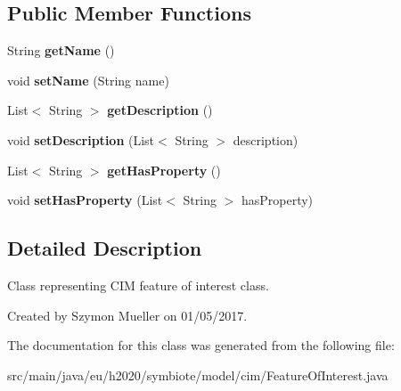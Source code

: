 \subsection*{Public Member Functions}
\begin{DoxyCompactItemize}
\item 
\mbox{\label{classeu_1_1h2020_1_1symbiote_1_1model_1_1cim_1_1FeatureOfInterest_acf580472ed782b001418bcf199d3126f}} 
String {\bfseries get\+Name} ()
\item 
\mbox{\label{classeu_1_1h2020_1_1symbiote_1_1model_1_1cim_1_1FeatureOfInterest_ab251871442c85a2932b0067d24b07fb3}} 
void {\bfseries set\+Name} (String name)
\item 
\mbox{\label{classeu_1_1h2020_1_1symbiote_1_1model_1_1cim_1_1FeatureOfInterest_a1dc51ed5d5592a64a01d6d0ed5ac39c0}} 
List$<$ String $>$ {\bfseries get\+Description} ()
\item 
\mbox{\label{classeu_1_1h2020_1_1symbiote_1_1model_1_1cim_1_1FeatureOfInterest_aab7b0ce7b672a87228e3ae0cb56f99e2}} 
void {\bfseries set\+Description} (List$<$ String $>$ description)
\item 
\mbox{\label{classeu_1_1h2020_1_1symbiote_1_1model_1_1cim_1_1FeatureOfInterest_a8bb935ed4fbe03e550302580610cb84f}} 
List$<$ String $>$ {\bfseries get\+Has\+Property} ()
\item 
\mbox{\label{classeu_1_1h2020_1_1symbiote_1_1model_1_1cim_1_1FeatureOfInterest_adca3633a2245d15f56c194f1be8bd05a}} 
void {\bfseries set\+Has\+Property} (List$<$ String $>$ has\+Property)
\end{DoxyCompactItemize}


\subsection{Detailed Description}
Class representing C\+IM feature of interest class.

Created by Szymon Mueller on 01/05/2017. 

The documentation for this class was generated from the following file\+:\begin{DoxyCompactItemize}
\item 
src/main/java/eu/h2020/symbiote/model/cim/Feature\+Of\+Interest.\+java\end{DoxyCompactItemize}
